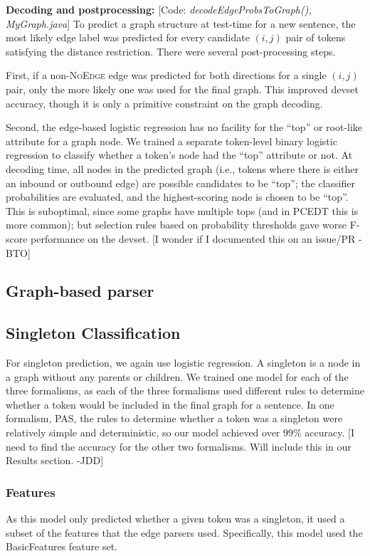 \documentclass[11pt]{article}
\newcommand{\bocomment}[1]{\textcolor{Bittersweet}{[#1 -BTO]}}
\newcommand{\jdcomment}[1]{\textcolor{NavyBlue}{[#1 -JDD]}}
\newcommand{\codenote}[1]{\textcolor{PineGreen}{[Code: \emph{#1}]}}
\begin{document}
\textbf{Decoding and postprocessing:}
\codenote{decodeEdgeProbsToGraph(), MyGraph.java}
To predict a graph structure at test-time for a new sentence,
the most likely edge label was predicted for every candidate $(i,j)$ pair of tokens satisfying the distance restriction.  There were several post-processing steps.

First, if a non-\textsc{NoEdge} edge was predicted for both directions for a single $(i,j)$ pair, only the more likely one was used for the final graph.  This improved devset accuracy, though it is only a primitive constraint on the graph decoding.

Second, the edge-based logistic regression has no facility for the ``top'' or root-like attribute for a graph node.  We trained a separate token-level binary logistic regression to classify whether a token's node had the ``top'' attribute or not.  At decoding time, all nodes in the predicted graph (i.e., tokens where there is either an inbound or outbound edge) are possible candidates to be ``top''; the classifier probabilities are evaluated, and the highest-scoring node is chosen to be ``top''.
This is suboptimal, since some graphs have multiple tops (and in PCEDT this is more common); but selection rules based on probability thresholds gave worse F-score performance on the devset. \bocomment{I wonder if I documented this on an issue/PR}


\subsection{Graph-based parser} \label{s:graphparser}

\subsection{Singleton Classification}
For singleton prediction, we again use logistic regression. A singleton is a node in a graph without any parents or children. We trained one model for each of the three formalisms, as each of the three formalisms used different rules to determine whether a token would be included in the final graph for a sentence. In one formalism, PAS, the rules to determine whether a token was a singleton were relatively simple and deterministic, so our model achieved over 99\% accuracy. \jdcomment{I need to find the accuracy for the other two formalisms. Will include this in our Results section.}

\subsubsection{Features}
As this model only predicted whether a given token was a singleton, it used a subset of the features that the edge parsers used. Specifically, this model used the BasicFeatures feature set. 
\end{document}
